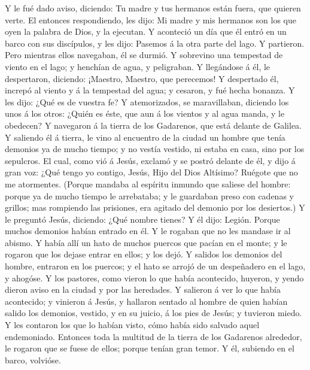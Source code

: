  Y le fué dado aviso, diciendo: Tu madre y tus hermanos
están fuera, que quieren verte.  El entonces
respondiendo, les dijo: Mi madre y mis hermanos son los que oyen la
palabra de Dios, y la ejecutan.  Y aconteció un día que
él entró en un barco con sus discípulos, y les dijo: Pasemos á la otra
parte del lago. Y partieron.  Pero mientras ellos
navegaban, él se durmió. Y sobrevino una tempestad de viento en el lago;
y henchían de agua, y peligraban.  Y llegándose á él, le
despertaron, diciendo: ¡Maestro, Maestro, que perecemos! Y despertado
él, increpó al viento y á la tempestad del agua; y cesaron, y fué hecha
bonanza.  Y les dijo: ¿Qué es de vuestra fe? Y
atemorizados, se maravillaban, diciendo los unos á los otros: ¿Quién es
éste, que aun á los vientos y al agua manda, y le obedecen?
 Y navegaron á la tierra de los Gadarenos, que está
delante de Galilea.  Y saliendo él á tierra, le vino al
encuentro de la ciudad un hombre que tenía demonios ya de mucho tiempo;
y no vestía vestido, ni estaba en casa, sino por los sepulcros.
 El cual, como vió á Jesús, exclamó y se postró delante
de él, y dijo á gran voz: ¿Qué tengo yo contigo, Jesús, Hijo del Dios
Altísimo? Ruégote que no me atormentes.  (Porque mandaba
al espíritu inmundo que saliese del hombre: porque ya de mucho tiempo le
arrebataba; y le guardaban preso con cadenas y grillos; mas rompiendo
las prisiones, era agitado del demonio por los desiertos.)
 Y le preguntó Jesús, diciendo: ¿Qué nombre tienes? Y él
dijo: Legión. Porque muchos demonios habían entrado en él.
 Y le rogaban que no les mandase ir al abismo.
 Y había allí un hato de muchos puercos que pacían en el
monte; y le rogaron que los dejase entrar en ellos; y los dejó.
 Y salidos los demonios del hombre, entraron en los
puercos; y el hato se arrojó de un despeñadero en el lago, y ahogóse.
 Y los pastores, como vieron lo que había acontecido,
huyeron, y yendo dieron aviso en la ciudad y por las heredades.
 Y salieron á ver lo que había acontecido; y vinieron á
Jesús, y hallaron sentado al hombre de quien habían salido los demonios,
vestido, y en su juicio, á los pies de Jesús; y tuvieron miedo.
 Y les contaron los que lo habían visto, cómo había sido
salvado aquel endemoniado.  Entonces toda la multitud de
la tierra de los Gadarenos alrededor, le rogaron que se fuese de ellos;
porque tenían gran temor. Y él, subiendo en el barco, volvióse.
